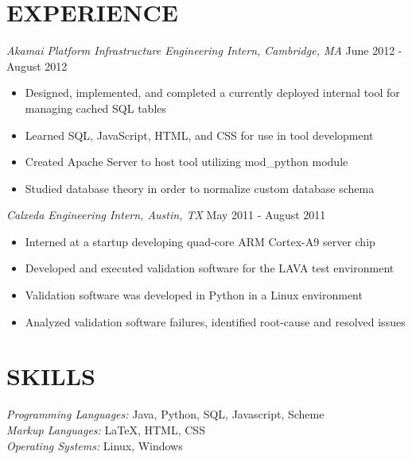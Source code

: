 \documentclass[margin]{res}
\begin{document}
\begin{resume}
                

\section{EXPERIENCE} {\sl Akamai Platform Infrastructure Engineering Intern, Cambridge, MA} \hfill June 2012 -  August 2012 
                 \begin{itemize}  \itemsep -2pt %
                         \item  Designed, implemented, and completed a currently deployed internal tool for managing cached SQL tables
                         \item Learned SQL, JavaScript, HTML, and CSS for use in tool development
                         \item Created Apache Server to host tool utilizing mod\_python module 
                         \item Studied database theory in order to normalize custom database schema
                \end{itemize}

                {\sl Calxeda Engineering Intern, Austin, TX} \hfill            May 2011 - August 2011 
                 \begin{itemize}  \itemsep -2pt %
                                \item  Interned at a startup developing quad-core ARM Cortex-A9 server chip
                                \item Developed and executed validation software for the LAVA test environment
                                \item Validation software was developed in Python in a Linux environment
                                \item Analyzed validation software failures, identified root-cause and resolved issues
                 \end{itemize} 
 
\section{SKILLS} {\sl Programming Languages:} Java, Python, SQL, Javascript, Scheme
                 \\
                 {\sl Markup Languages:} \LaTeX, HTML, CSS \\
                {\sl Operating Systems:} Linux, Windows
 
 

\end{resume}
\end{document}
